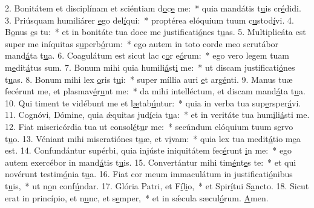 2. Bonitátem et disciplínam et sciéntiam d\uline{o}c\uline{e} me:~* quia mandátis t\uline{u}is cr\uline{é}didi.
3. Priúsquam humiliárer \uline{e}go del\uline{í}qui:~* proptérea elóquium tuum c\uline{u}stod\uline{í}vi.
4. B\uline{o}nus \uline{e}s tu:~* et in bonitáte tua doce me justificati\uline{ó}nes t\uline{u}as.
5. Multiplicáta est super me iníquitas s\uline{u}perb\uline{ó}rum:~* ego autem in toto corde meo scrutábor mand\uline{á}ta t\uline{u}a.
6. Coagulátum est sicut lac c\uline{o}r e\uline{ó}rum:~* ego vero legem tuam m\uline{e}dit\uline{á}tus sum.
7. Bonum mihi quia humili\uline{á}st\uline{i} me:~* ut discam justificati\uline{ó}nes t\uline{u}as.
8. Bonum mihi lex \uline{o}ris t\uline{u}i:~* super míllia auri \uline{e}t arg\uline{é}nti.
9. Manus tuæ fecérunt me, et plasmav\uline{é}r\uline{u}nt me:~* da mihi intelléctum, et discam mand\uline{á}ta t\uline{u}a.
10. Qui timent te vidébunt me et l\uline{æ}tab\uline{ú}ntur:~* quia in verba tua sup\uline{e}rsper\uline{á}vi.
11. Cognóvi, Dómine, quia ǽquitas jud\uline{í}cia t\uline{u}a:~* et in veritáte tua hum\uline{i}li\uline{á}sti me.
12. Fiat misericórdia tua ut consol\uline{é}t\uline{u}r me:~* secúndum elóquium tuum s\uline{e}rvo t\uline{u}o.
13. Véniant mihi miseratiónes t\uline{u}æ, et v\uline{i}vam:~* quia lex tua medit\uline{á}tio m\uline{e}a est.
14. Confundántur supérbi, quia injúste iniquitátem fec\uline{é}runt \uline{i}n me:~* ego autem exercébor in mand\uline{á}tis t\uline{u}is.
15. Convertántur mihi tim\uline{é}nt\uline{e}s te:~* et qui novérunt testim\uline{ó}nia t\uline{u}a.
16. Fiat cor meum immaculátum in justificati\uline{ó}nibus t\uline{u}is,~* ut n\uline{o}n conf\uline{ú}ndar.
17. Glória Patri, et F\uline{í}l\uline{i}o,~* et Spir\uline{í}tui S\uline{a}ncto.
18. Sicut erat in princípio, et n\uline{u}nc, et s\uline{e}mper,~* et in sǽcula sæcul\uline{ó}rum. \uline{A}men.
